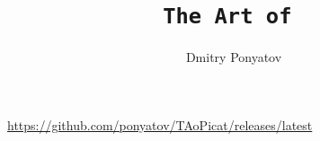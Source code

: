 



\title{\Large{\texttt{The Art of \cat}}}
\author{Dmitry Ponyatov }

\maketitle

\tableofcontents

\vspace{1cm}
\url{https://github.com/ponyatov/TAoPicat/releases/latest}








